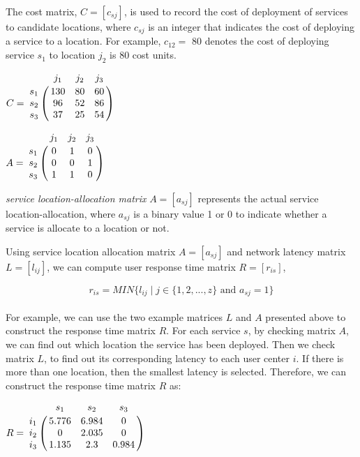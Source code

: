 \documentclass{llncs}
\let\bbordermatrix\bordermatrix
\begin{document}
The cost matrix, $C = [c_{sj}]$, is used to record the cost of deployment of services to candidate locations, 
where $c_{sj}$ is an integer that indicates the cost of deploying a service to a location. 
For example, $c_{12} = $ 80 denotes the cost of deploying service $s_{1}$ to location $j_{2}$ is 80 cost units.

\parbox{.45\linewidth}{
{\centering
$
C = \bbordermatrix{~ & j_{1} & j_{2} & j_{3}\cr
					s_{1}	&130 &80 &60\cr
					s_{2}	&96  &52 &86\cr
					s_{3}	&37 &25 &54\cr}
$
\\}
}
\parbox{.45\linewidth}{
{\centering
$
A = \bbordermatrix{~ & j_{1} & j_{2} & j_{3}\cr
					s_{1}	&0 &1 &0	\cr
					s_{2}	&0  &0 &1	\cr
					s_{3}	&1 &1 &0	\cr}
$
\\}
}


\emph{service location-allocation matrix} $A = [a_{sj}]$ represents the actual service location-allocation, where $a_{sj}$  is a binary value 1 or 0 to indicate whether a service is allocate to a location or not.

Using service location allocation matrix $A = [a_{sj}]$ and network latency matrix $L = [l_{ij}]$, we can compute user
response time matrix $R = [r_{is}]$, 

{\centering
	\begin{equation}
		r_{is} = MIN\{l_{ij} \mid j \in \{1, 2, ..., z\} \text{ and } a_{sj} = 1\}
	\end{equation}
\\}
For example, we can use the two example matrices $L$ and $A$ presented above to construct the response time matrix $R$. 
For each service $s$, by checking matrix $A$, we can find out which location the service has been deployed.
Then we check matrix $L$, to find out its corresponding latency to each user center $i$. If there is
more than one location, then the smallest latency is selected. Therefore, we can construct the response time matrix $R$ as:

{\centering
$
R = \bbordermatrix{~ & s_{1} & s_{2} & s_{3}\cr
					i_{1}	&5.776 &6.984 &0	\cr
					i_{2}	&0  &2.035 &0	\cr
					i_{3}	&1.135 &2.3 &0.984	\cr}
$
\\}


\end{document}
